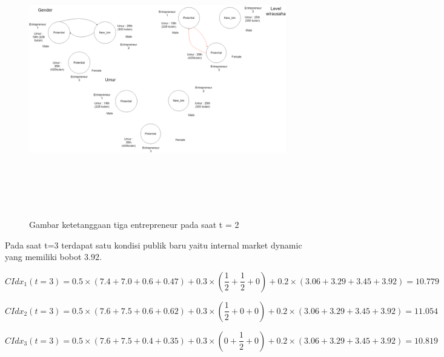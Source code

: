 	\begin{figure} [H]
		\centering  
		\includegraphics[width=18cm, height=12cm]{gambarwirausaha(t=2)} 
		\caption[Gambar ketetanggaan tiga entrepreneur pada saat t = 2]{Gambar ketetanggaan tiga entrepreneur pada saat t = 2} 
		\label{fig:t0} 
	\end{figure}
	
	Pada saat t=3 terdapat satu kondisi publik baru yaitu internal market dynamic yang memiliki bobot 3.92.
	
\begin{equation}
	CIdx_{1}(t=3) = 0.5 \times (7.4 + 7.0 + 0.6 + 0.47) + 0.3 \times (\frac {1} {2} + \frac {1} {2}  + 0) + 0.2 \times (3.06 + 3.29 + 3.45 + 3.92) = 10.779
\end{equation}

\begin{equation}
	CIdx_{2}(t=3) = 0.5 \times (7.6 + 7.5 + 0.6 + 0.62) + 0.3 \times (\frac {1} {2} + 0 + 0) + 0.2 \times (3.06 + 3.29 + 3.45 + 3.92) = 11.054
\end{equation}

\begin{equation}
	CIdx_{3}(t=3) = 0.5 \times (7.6 + 7.5 + 0.4 + 0.35) + 0.3 \times (0 + \frac {1} {2} + 0) + 0.2 \times (3.06 + 3.29+ 3.45 + 3.92) = 10.819
\end{equation}

